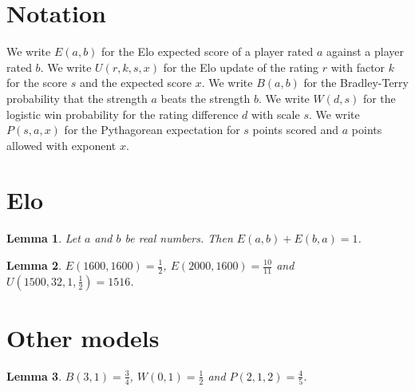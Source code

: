 \documentclass{article}
\newtheorem{lemma}{Lemma}
\begin{document}
\section{Notation}

We write $E(a,b)$ for the Elo expected score of a player rated $a$ against a player rated $b$.
We write $U(r,k,s,x)$ for the Elo update of the rating $r$ with factor $k$ for the score $s$ and the expected score $x$.
We write $B(a,b)$ for the Bradley-Terry probability that the strength $a$ beats the strength $b$.
We write $W(d,s)$ for the logistic win probability for the rating difference $d$ with scale $s$.
We write $P(s,a,x)$ for the Pythagorean expectation for $s$ points scored and $a$ points allowed with exponent $x$.

\section{Elo}

\begin{lemma}\label{symmetry}
Let $a$ and $b$ be real numbers. Then $E(a,b)+E(b,a)=1$.
\end{lemma}

\begin{lemma}\label{elo}
$E(1600,1600)=\frac12$, $E(2000,1600)=\frac{10}{11}$ and $U(1500,32,1,\frac12)=1516$.
\end{lemma}

\section{Other models}

\begin{lemma}\label{others}
$B(3,1)=\frac34$, $W(0,1)=\frac12$ and $P(2,1,2)=\frac45$.
\end{lemma}
\end{document}
